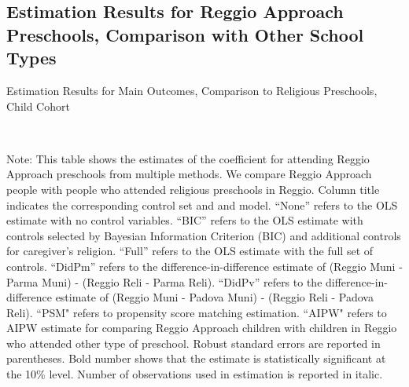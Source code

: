 






\subsection{Estimation Results for Reggio Approach Preschools, Comparison with Other School Types} \label{app:comparison-reli-stat}

\begin{table}[H] \caption{Estimation Results for Main Outcomes, Comparison to Religious Preschools, Child Cohort} \label{ols-M-child-reg-reli}
\scalebox{0.8}{}
\vspace{1ex} \\
\footnotesize\raggedright{Note: This table shows the estimates of the coefficient for attending Reggio Approach preschools from multiple methods. We compare Reggio Approach people with people who attended religious preschools in Reggio. Column title indicates the corresponding control set and and model. ``None'' refers to the OLS estimate with no control variables. ``BIC'' refers to the OLS estimate with controls selected by Bayesian Information Criterion (BIC) and additional controls for caregiver's religion. ``Full'' refers to the OLS estimate with the full set of controls. ``DidPm'' refers to the difference-in-difference estimate of (Reggio Muni - Parma Muni) - (Reggio Reli - Parma Reli). ``DidPv'' refers to the difference-in-difference estimate of (Reggio Muni - Padova Muni) - (Reggio Reli - Padova Reli). ``PSM" refers to propensity score matching estimation. ``AIPW" refers to AIPW estimate for comparing Reggio Approach children with children in Reggio who attended other type of preschool. Robust standard errors are reported in parentheses. Bold number shows that the estimate is statistically significant at the 10\% level. Number of observations used in estimation is reported in italic.}

\end{table}


